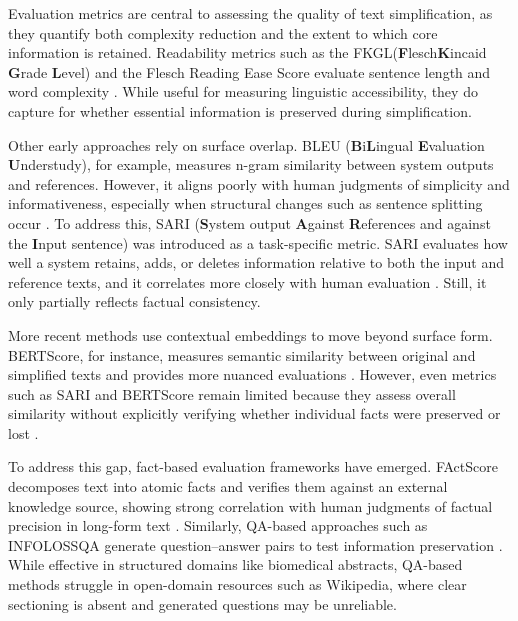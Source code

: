 \documentclass{DESSThesis}
\begin{document}
Evaluation metrics are central to assessing the quality of text simplification, as they quantify both complexity reduction and the extent to which core information is retained. Readability metrics such as the FKGL(\textbf{F}lesch\textbf{K}incaid \textbf{G}rade \textbf{L}evel) and the Flesch Reading Ease Score evaluate sentence length and word complexity \cite{kincaid1975derivation,dobbs1948new}. While useful for measuring linguistic accessibility, they do capture for whether essential information is preserved during simplification\cite{saggion2017automatic, tanprasert-kauchak-2021-flesch,}.

Other early approaches rely on surface overlap. BLEU (\textbf{B}i\textbf{L}ingual \textbf{E}valuation \textbf{U}nderstudy), for example, measures n-gram similarity between system outputs and references. However, it aligns poorly with human judgments of simplicity and informativeness, especially when structural changes such as sentence splitting occur \cite{papineni2002bleu,sulem2018bleu,xu2016optimizing}. To address this, SARI (\textbf{S}ystem output \textbf{A}gainst \textbf{R}eferences and against the \textbf{I}nput sentence) was introduced as a task-specific metric. SARI evaluates how well a system retains, adds, or deletes information relative to both the input and reference texts, and it correlates more closely with human evaluation \cite{xu-etal-2015-problems, saggion2017automatic}. Still, it only partially reflects factual consistency.

More recent methods use contextual embeddings to move beyond surface form. BERTScore, for instance, measures semantic similarity between original and simplified texts and provides more nuanced evaluations \cite{zhang2019bertscore, beauchemin2023meaningbert}. However, even metrics such as SARI and BERTScore remain limited because they assess overall similarity without explicitly verifying whether individual facts were preserved or lost \cite{vu2022layerrepresentationspacemakes,beauchemin2023meaningbert, cripwell2024evaluating}.

To address this gap, fact-based evaluation frameworks have emerged. FActScore decomposes text into atomic facts and verifies them against an external knowledge source, showing strong correlation with human judgments of factual precision in long-form text \cite{min2023factscore}. Similarly, QA-based approaches such as INFOLOSSQA generate question–answer pairs to test information preservation \cite{trienes2024infolossqacharacterizingrecoveringinformation}. While effective in structured domains like biomedical abstracts, QA-based methods struggle in open-domain resources such as Wikipedia, where clear sectioning is absent and generated questions may be unreliable.
\end{document}
